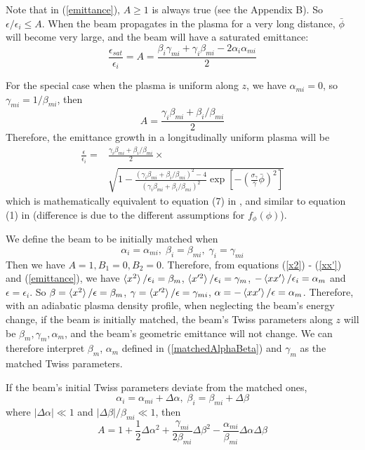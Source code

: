\documentclass[%
reprint, superscriptaddress,
 amsmath,amssymb, aps,
prstab,
]{revtex4-2}
\begin{document}
Note that in (\ref{emittance}), $A \geqslant 1$ is always true (see the Appendix B). So
$\epsilon/\epsilon_i \leqslant A$. When the beam propagates in the
plasma for a very long distance, $\bar \phi$ will become very large, and
the beam will have a saturated emittance: \[
\frac{\epsilon_{sat}}{\epsilon_i}=A = \frac{\beta_i
\gamma_{mi}+\gamma_i \beta_{mi}-2\alpha_i \alpha_{mi}}{2} \] 

For the special case when the plasma is uniform along $z$, we have $\alpha_{mi} = 0$, so $\gamma_{mi} = 1 /
\beta_{mi}$, then
\[ A = \frac{\gamma_i \beta_{mi} + \beta_i / \beta_{mi}}{2} \]
Therefore, the emittance growth in a longitudinally uniform plasma will
be 
\begin{equation}
\begin{aligned}
 \frac{\epsilon}{\epsilon_i}=& \frac{\gamma_i \beta_{mi} + \beta_i / \beta_{mi}}{2} \times
 \\
 &\sqrt{1 -\frac{(\gamma_i \beta_{mi} + \beta_i / \beta_{mi})^2-4}{(\gamma_i \beta_{mi} + \beta_i / \beta_{mi})^2}
\exp[-(\frac{\sigma_\gamma}{\bar \gamma}\bar \phi)^2]} 
\label{emittance_uniform}
\end{aligned}
\end{equation}
which is mathematically equivalent to equation (7) in \cite{German2018}, and similar to equation (1) in \cite{Xinlu2016} (difference is due to the different assumptions for $f_\phi(\phi)$).

We define the beam to be initially matched when
\begin{equation}
\alpha_i  = \alpha_{mi} ,\; \beta_i  = \beta_{mi} , \; \gamma_i  = \gamma_{mi} 
\label{match} 
\end{equation} 
Then we have $A = 1, B_1 = 0, B_2 = 0$.
Therefore, from equations (\ref{x2}) - (\ref{xx'}) and
(\ref{emittance}), we have $\braket{x^2}/\epsilon_i = \beta_m$,
$\braket{x'^2}/\epsilon_i = \gamma_m$, $-\braket{xx'}/\epsilon_i =
\alpha_m$ and $\epsilon = \epsilon_i$. So $\beta = \braket{x^2}/\epsilon = \beta_m$, $\gamma = \braket{x'^2}/\epsilon = \gamma_{mi}$, $\alpha = -\braket{xx'}/\epsilon = \alpha_m$.
Therefore, with an
adiabatic plasma density profile, when neglecting the beam's energy
change, if the beam is initially matched, the beam's Twiss parameters
along $z$ will be $\beta_m, \gamma_m, \alpha_m$, and
the beam's geometric emittance will not change. We can therefore interpret $\beta_m$, $\alpha_m$ defined in (\ref{matchedAlphaBeta}) and $\gamma_m$ as the matched Twiss parameters.

If the beam's initial Twiss parameters deviate from the matched ones,
\[
\alpha_i  = \alpha_{mi} + \Delta \alpha ,\; \beta_i  = \beta_{mi} + \Delta \beta 
\]
where $|\Delta \alpha | \ll 1$ and $|\Delta \beta| / \beta_{mi} \ll 1$, then
\[
A = 1 + \frac{1}{2} \Delta \alpha^2 + \frac{\gamma_{mi}}{2\beta_{mi}} \Delta \beta^2 - \frac{\alpha_{mi}}{\beta_{mi}} \Delta \alpha \Delta \beta
\]
\end{document}
